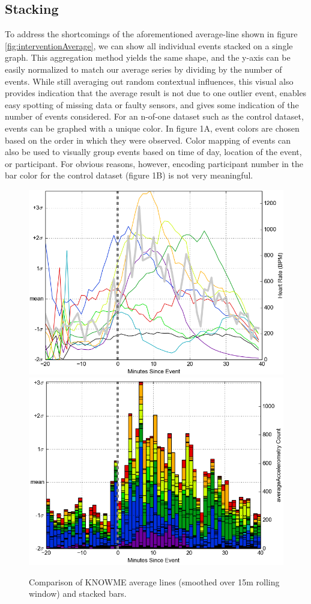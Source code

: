 \subsection{Stacking}
To address the shortcomings of the aforementioned average-line shown in figure \ref{fig:interventionAverage}, we can show all individual events stacked on a single graph.
This aggregation method yields the same shape, and the y-axis can be easily normalized to match our average series by dividing by the number of events.
While still averaging out random contextual influences, this visual also provides indication that the average result is not due to one outlier event, enables easy spotting of missing data or faulty sensors, and gives some indication of the number of events considered.
For an n-of-one dataset such as the control dataset, events can be graphed with a unique color.
In figure 1A, event colors are chosen based on the order in which they were observed.
Color mapping of events can also be used to visually group events based on time of day, location of the event, or participant.
For obvious reasons, however, encoding participant number in the bar color for the control dataset (figure 1B) is not very meaningful.

\begin{figure}
\centering
\includegraphics[width=0.9\columnwidth]{./img/knowMe_60m_lines_smoothed15m.png}
\includegraphics[width=0.9\columnwidth]{./img/knowMe_60m_bars.png}
\caption{Comparison of KNOWME average lines (smoothed over 15m rolling window) and stacked bars.}
\label{fig:knowMeCompare}
\end{figure}

